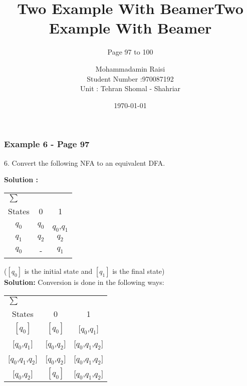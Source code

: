 \documentclass{beamer}
\title[About Beamer] %
{Two Example With Beamer}
\subtitle{Page 97 to 100}
\title{Two Example With Beamer}
\author{Mohammadamin Raisi\\ Student Number :970087192 \\ Unit : Tehran Shomal - Shahriar}
\date{\today}
\begin{document}
\frame{\titlepage}

\begin{frame}
\frametitle{Example 6 -  Page 97}6. Convert the following NFA to an equivalent DFA.


\textbf{Solution :}

\begin{center}

\begin{tabular}{ccc}
\toprule
\multicolumn{3}{l}{$\sum$} \\
\cmidrule(r){1-1}
 States & 0 & 1 \\
    \midrule
    ${q}_{0}$ & ${q}_{0}$ & ${q}_{0}$,${q}_{1}$ \\
    ${q}_{1}$ & ${q}_{2}$ & ${q}_{2}$ \\
    ${q}_{0}$ & - & ${q}_{1}$ \\

    \bottomrule


\end{tabular}

\end{center}



\end{frame}

\begin{frame}

($[{q}_{0}]$ is the initial state and $[{q}_{1}]$ is the final state)\\
\textbf{Solution:} Conversion is done in the following ways:
\\

\begin{center}

\begin{tabular}{ccc}
\toprule
\multicolumn{3}{l}{$\sum$} \\
\cmidrule(r){1-1}
 States & 0 & 1 \\
    \midrule
    $[{q}_{0}]$ & $[{q}_{0}]$ & $[{q}_{0}$,${q}_{1}]$ \\
    $[{q}_{0}$,${q}_{1}]$ & $[{q}_{0}$,${q}_{2}]$ & $[{q}_{0}$,${q}_{1}$,${q}_{2}]$ \\
    $[{q}_{0}$,${q}_{1}$,${q}_{2}]$ & $[{q}_{0}$,${q}_{2}]$ & $[{q}_{0}$,${q}_{1}$,${q}_{2}]$ \\
    $[{q}_{0}$,${q}_{2}]$ & $[{q}_{0}]$ & $[{q}_{0}$,${q}_{1}$,${q}_{2}]$ \\

    \bottomrule


\end{tabular}

\end{center}


\end{frame}
\end{document}
